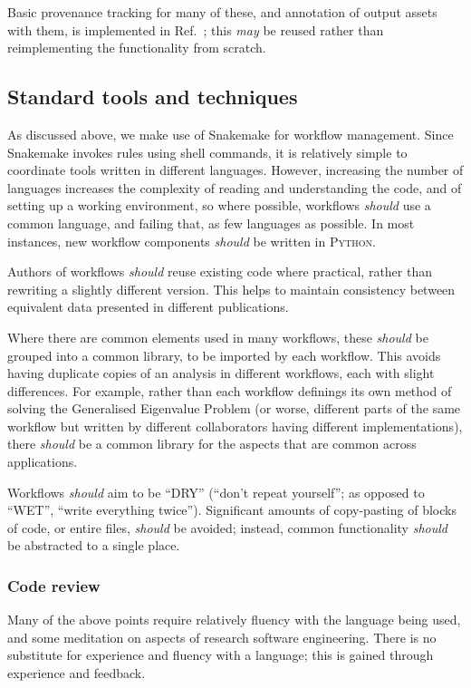 \documentclass{article}
\newcommand\rfcword[1]{\emph{#1}\xspace}
\newcommand\should{\rfcword{should}}
\newcommand\may{\rfcword{may}}
\newcommand\program[1]{\textsc{#1}\xspace}
\begin{document}
Basic provenance tracking for many of these,
and annotation of output assets with them,
is implemented in Ref.~\cite{bennett_2024_13819431};
this \may be reused rather than reimplementing the functionality from scratch.

\subsection{Standard tools and techniques}

As discussed above,
we make use of Snakemake for workflow management.
Since Snakemake invokes rules using shell commands,
it is relatively simple to coordinate tools written in different languages.
However,
increasing the number of languages increases the complexity of reading and understanding the code,
and of setting up a working environment,
so where possible,
workflows \should use a common language,
and failing that,
as few languages as possible.
In most instances,
new workflow components \should be written in \program{Python}.

Authors of workflows \should reuse existing code where practical,
rather than rewriting a slightly different version.
This helps to maintain consistency between equivalent data presented in different publications.

Where there are common elements used in many workflows,
these \should be grouped into a common library,
to be imported by each workflow.
This avoids having duplicate copies of an analysis in different workflows,
each with slight differences.
For example,
rather than each workflow definings its own method of
solving the Generalised Eigenvalue Problem
(or worse,
different parts of the same workflow but written by different collaborators
having different implementations),
there \should be a common library for the aspects that are common across applications.

Workflows \should aim to be ``DRY''
(``don't repeat yourself'';
as opposed to ``WET'',
``write everything twice'').
Significant amounts of copy-pasting of blocks of code,
or entire files,
\should be avoided;
instead,
common functionality \should be abstracted to a single place.


\subsubsection{Code review}

Many of the above points require relatively fluency with the language being used,
and some meditation on aspects of research software engineering.
There is no substitute for experience and fluency with a language;
this is gained through experience and feedback.
\end{document}
